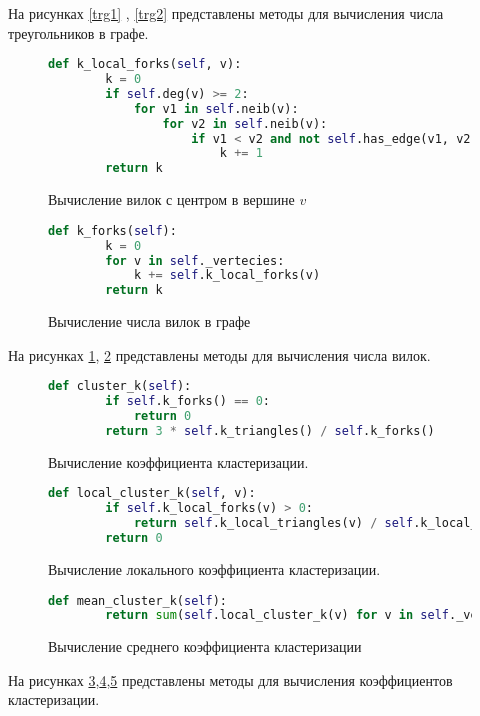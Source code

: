 На рисунках \ref{trg1} , \ref{trg2} 
представлены методы для вычисления числа треугольников 
в графе.
\begin{figure}[H] 
\begin{lstlisting}[language=Python] 
    def k_local_forks(self, v):
        k = 0
        if self.deg(v) >= 2:
            for v1 in self.neib(v):
                for v2 in self.neib(v):
                    if v1 < v2 and not self.has_edge(v1, v2):
                        k += 1
        return k
\end{lstlisting}  
    \caption{Вычисление вилок с центром в вершине $v$}
    \label{fork_1}
\end{figure} 
\begin{figure}[H] 
\begin{lstlisting}[language=Python] 
    def k_forks(self):
        k = 0
        for v in self._vertecies:
            k += self.k_local_forks(v)
        return k
\end{lstlisting}  
    \caption{Вычисление числа вилок в графе}
    \label{fork_2}
\end{figure} 
На рисунках \ref{fork_1}, \ref{fork_2}
представлены методы для вычисления числа вилок.
\begin{figure}[H] 
\begin{lstlisting}[language=Python] 
    def cluster_k(self):
        if self.k_forks() == 0:
            return 0
        return 3 * self.k_triangles() / self.k_forks()
\end{lstlisting}  
    \caption{Вычисление коэффициента кластеризации.}
    \label{cluster_1}
\end{figure} 
\begin{figure}[H] 
\begin{lstlisting}[language=Python] 
    def local_cluster_k(self, v):
        if self.k_local_forks(v) > 0:
            return self.k_local_triangles(v) / self.k_local_forks(v)
        return 0
\end{lstlisting}  
    \caption{Вычисление локального коэффициента кластеризации.}
    \label{cluster_2}
\end{figure} 
\begin{figure}[H] 
\begin{lstlisting}[language=Python] 
    def mean_cluster_k(self):
        return sum(self.local_cluster_k(v) for v in self._vertecies) / self.k_vertecies()
\end{lstlisting}  
    \caption{Вычисление среднего коэффициента кластеризации}
    \label{cluster_3}
\end{figure} 
На рисунках \ref{cluster_1},\ref{cluster_2},\ref{cluster_3}
представлены методы для вычисления коэффициентов кластеризации.
